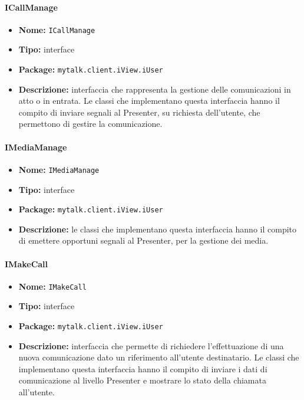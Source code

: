 {{\paragraph{ICallManage}{
	\begin{itemize}
		\item [] \textbf{Nome:} \texttt{ICallManage}
		\item [] \textbf{Tipo:} interface
		\item [] \textbf{Package:} \texttt{mytalk.client.iView.iUser}
		\item [] \textbf{Descrizione:}{ interfaccia che rappresenta la gestione delle comunicazioni in atto o in entrata. Le classi che implementano questa interfaccia hanno il compito di inviare segnali al Presenter, su richiesta dell'utente, che permettono di gestire la comunicazione.}
	\end{itemize}
}
\paragraph{IMediaManage}{
	\begin{itemize}
		\item [] \textbf{Nome:} \texttt{IMediaManage}
		\item [] \textbf{Tipo:} interface
		\item [] \textbf{Package:} \texttt{mytalk.client.iView.iUser}
		\item [] \textbf{Descrizione:}{ le classi che implementano questa interfaccia hanno il compito di emettere opportuni segnali al Presenter, per la gestione dei media.}
	\end{itemize}
}
\paragraph{IMakeCall}{
	\begin{itemize}
		\item [] \textbf{Nome:} \texttt{IMakeCall}
		\item [] \textbf{Tipo:} interface
		\item [] \textbf{Package:} \texttt{mytalk.client.iView.iUser}
		\item [] \textbf{Descrizione:}{ interfaccia che permette di richiedere l'effettuazione di una nuova comunicazione dato un riferimento all'utente destinatario. Le classi che implementano questa interfaccia hanno il compito di inviare i dati di comunicazione al livello Presenter e mostrare lo stato della chiamata all'utente.}
	\end{itemize}
}
}
}
